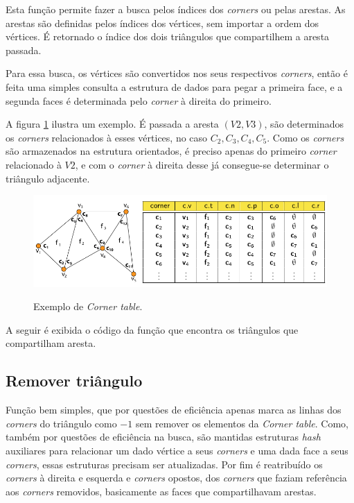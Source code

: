 \documentclass[a4paper]{article}
\begin{document}
Esta função permite fazer a busca pelos índices dos \textit{corners} ou pelas arestas. As arestas são definidas pelos índices dos vértices, sem importar a ordem dos vértices. É retornado o índice dos dois triângulos que compartilhem a aresta passada.

Para essa busca, os vértices são convertidos nos seus respectivos \textit{corners}, então é feita uma simples consulta a estrutura de dados para pegar a primeira face, e a segunda faces é determinada pelo \textit{corner} à direita do primeiro.

A figura \ref{fig:find_triangle} ilustra um exemplo. É passada a aresta $(V2,V3)$, são determinados os \textit{corners} relacionados à esses vértices, no caso ${C_2, C_3, C_4, C_5}$. Como os \textit{corners} são armazenados na estrutura orientados, é preciso apenas do primeiro \textit{corner} relacionado à $V2$, e com o \textit{corner} à direita desse já consegue-se determinar o triângulo adjacente.
 

\begin{figure}[H]
	\centering
	\includegraphics[width=1.0\textwidth]{./imgs/corner_table_example.png}
	\label{fig:find_triangle} 
	\caption[caption]{Exemplo de \textit{Corner table}.}
\end{figure}


A seguir é exibida o código da função que encontra os triângulos que compartilham aresta.



\subsection{Remover triângulo}

Função bem simples, que por questões de eficiência apenas marca as linhas dos \textit{corners} do triângulo como $-1$ sem remover os elementos da \textit{Corner table}. Como, também por questões de eficiência na busca, são mantidas estruturas \textit{hash} auxiliares para relacionar um dado vértice a seus \textit{corners} e uma dada face a seus \textit{corners}, essas estruturas precisam ser atualizadas. Por fim é reatribuído os \textit{corners} à direita e esquerda e \textit{corners} opostos, dos \textit{corners} que faziam referência aos \textit{corners} removidos, basicamente as faces que compartilhavam arestas.
\end{document}
